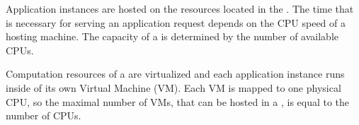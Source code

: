 
Application instances are hosted on the resources located in the \dcs{}.
The time that is necessary for serving an application request depends on the CPU speed of a hosting machine.
The capacity of a \dc{} is determined by the number of available CPUs. 


Computation resources of a \dc{} are virtualized and each application instance runs inside of its own Virtual Machine (VM). Each VM is mapped to one physical CPU, so the maximal number of VMs, that can be hosted in a \dc{}, is equal to the number of CPUs.

